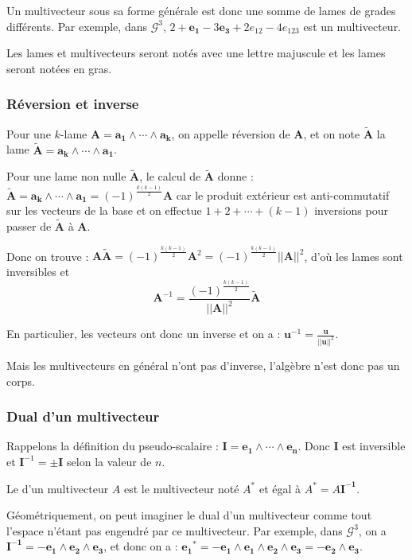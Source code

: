Un multivecteur sous sa forme générale est donc une somme de lames de grades différents. Par exemple, dans $\mathscr{G}^3$, $2+ \bm{e_1}-3\bm{e_3}+2e_{12}-4e_{123}$ est un multivecteur.

Les lames et multivecteurs seront notés avec une lettre majuscule et les lames seront notées en gras.  

\subsubsection{Réversion et inverse}

Pour une $k$-lame $\bm{A} = \bm{a_1} \wedge \cdots \wedge \bm{a_k}$, on appelle réversion de $\bm{A}$, et on note $\bm{\tilde{A}}$ la lame $\bm{\tilde{A}} = \bm{a_k} \wedge \cdots \wedge \bm{a_1}$.

Pour une lame non nulle $\tilde{\bm{A}}$, le calcul de $\tilde{\bm{A}}$ donne : $\tilde{\bm{A}} =  \bm{a_k} \wedge \cdots \wedge \bm{a_1} = (-1)^{\frac{k(k-1)}{2}}\bm{A}$ car le produit extérieur est anti-commutatif sur les vecteurs de la base et on effectue $1+2+\cdots +(k-1)$ inversions pour passer de $\tilde{\bm{A}}$ à $\bm{A}$.

Donc on trouve : $\bm{A}\tilde{\bm{A}} = (-1)^{\frac{k(k-1)}{2}}\bm{A}^2 = (-1)^{\frac{k(k-1)}{2}}||\bm{A}||^2$, d'où les lames sont inversibles et  $$\bm{A}^{-1} = \frac{(-1)^{\frac{k(k-1)}{2}}}{||\bm{A}||^2} \tilde{\bm{A}}$$

En particulier, les vecteurs ont donc un inverse et on a : $\bm{u}^{-1} = \frac{\bm{u}}{||\bm{u}||^2}$. 

Mais les multivecteurs en général n'ont pas d'inverse, l'algèbre n'est donc pas un corps.

\subsubsection{Dual d'un multivecteur}

Rappelons la définition du pseudo-scalaire : $\bm{I} = \bm{e_1} \wedge \cdots \wedge \bm{e_n}$.  Donc $\bm{I}$ est inversible et $\bm{I}^{-1} = \pm \bm{I}$ selon la valeur de $n$. 

Le  d'un multivecteur $A$ est le multivecteur noté $A^*$ et égal à $A^* = A\bm{I^{-1}}$.

Géométriquement, on peut imaginer le dual d'un multivecteur comme tout l'espace n'étant pas engendré par ce multivecteur. Par exemple, dans $\mathscr{G}^3$, on a $\bm{I^{-1}} = -\bm{e_1} \wedge \bm{e_2} \wedge \bm{e_3}$, et donc on a : $\bm{e_{1}}^* = -\bm{e_1}\wedge \bm{e_1}\wedge \bm{e_2} \wedge \bm{e_3} = -\bm{e_2} \wedge \bm{e_3}$.

